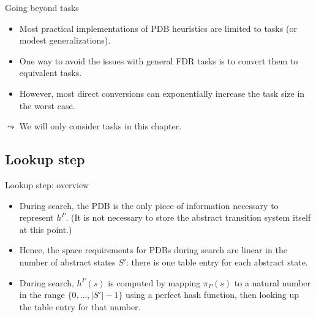 \documentclass{gkibeamer}
\begin{document}
\begin{frame}{Going beyond {\sasplus} tasks}
  \begin{itemize}
  \item Most practical implementations of PDB heuristics are limited
    to {\sasplus} tasks (or modest generalizations).
  \item One way to avoid the issues with general FDR tasks is to
    convert them to equivalent {\sasplus} tasks.
  \item However, most direct conversions can exponentially increase
    the task size in the worst case.
  \end{itemize}
  $\leadsto$ We will only consider {\sasplus} tasks in this chapter.
\end{frame}

\subsection[Lookup]{Lookup step}

\begin{frame}{Lookup step: overview}
  \begin{itemize}
  \item During search, the PDB is the only piece of information
    necessary to represent $h^P$. (It is not necessary to store the
    abstract transition system itself at this point.)
  \item Hence, the space requirements for PDBs during search are
    linear in the number of abstract states $S'$: there is one table
    entry for each abstract state.
  \item During search, $h^P(s)$ is computed by mapping
    $\pi_P(s)$ to a natural number in the range
    $\{0, \dots, |S'| - 1\}$
    using a \alert{perfect hash function}, then looking up the table
    entry for that number.
  \end{itemize}
\end{frame}
\end{document}
